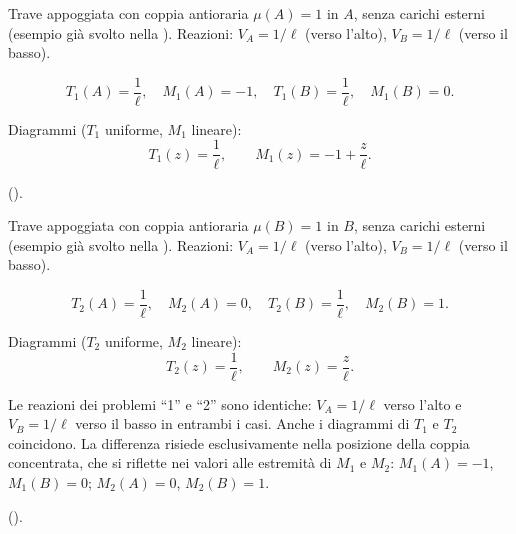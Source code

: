 \begin{esempio}
\begin{svolgimento}
		



		
		
		Trave appoggiata con coppia antioraria
		$\mu(A) = 1$ in $A$, senza carichi esterni
		(esempio già svolto nella
		).
		Reazioni: $V_A = 1/\ell$ (verso l'alto),
		$V_B = 1/\ell$ (verso il basso).
		
		\[
		T_1(A) = \frac{1}{\ell}, \quad
		M_1(A) = -1, \quad
		T_1(B) = \frac{1}{\ell}, \quad
		M_1(B) = 0.
		\]
		
		Diagrammi ($T_1$ uniforme, $M_1$ lineare):
		\[
		T_1(z) = \frac{1}{\ell},
		\qquad
		M_1(z) = -1 + \frac{z}{\ell}.
		\]
		
		().
		



		

		Trave appoggiata con coppia antioraria
		$\mu(B) = 1$ in $B$, senza carichi esterni
		(esempio già svolto nella
		).
		Reazioni: $V_A = 1/\ell$ (verso l'alto),
		$V_B = 1/\ell$ (verso il basso).
		
		\[
		T_2(A) = \frac{1}{\ell}, \quad
		M_2(A) = 0, \quad
		T_2(B) = \frac{1}{\ell}, \quad
		M_2(B) = 1.
		\]
		
		Diagrammi ($T_2$ uniforme, $M_2$ lineare):
		\[
		T_2(z) = \frac{1}{\ell},
		\qquad
		M_2(z) = \frac{z}{\ell}.
		\]
		
		Le reazioni dei problemi ``1'' e ``2'' sono
		identiche: $V_A = 1/\ell$ verso l'alto e
		$V_B = 1/\ell$ verso il basso in entrambi
		i casi. Anche i diagrammi di $T_1$ e $T_2$
		coincidono. La differenza risiede
		esclusivamente nella posizione della coppia
		concentrata, che si riflette nei valori
		alle estremità di $M_1$ e $M_2$:
		$M_1(A) = -1$, $M_1(B) = 0$;
		$M_2(A) = 0$, $M_2(B) = 1$.
		
		().
		
		



		
		


\end{svolgimento}
\end{esempio}
